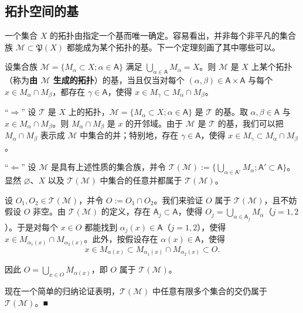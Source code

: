 \subsection*{拓扑空间的基}

一个集合 $ X $ 的拓扑由指定一个基而唯一确定。容易看出，并非每个非平凡的集合族 $ \mathcal{M} \subset \mathfrak{P}(X) $ 都能成为某个拓扑的基。下一个定理刻画了其中哪些可以。

\begin{theorem}

设集合族 $ \mathcal{M} = \{ M_\alpha \subset X ; \alpha \in \mathsf{A} \} $ 满足 $ \bigcup_{\alpha \in \mathsf{A}} M_\alpha = X $。则 $ \mathcal{M} $ 是 $ X $ 上某个拓扑（称为\textbf{由 $ \mathcal{M} $ 生成的拓扑}）的基，当且仅当对每个 $ (\alpha, \beta) \in \mathsf{A} \times \mathsf{A} $ 与每个 $ x \in M_\alpha \cap M_\beta $，都存在 $ \gamma \in \mathsf{A} $，使得 $ x \in M_\gamma \subset M_\alpha \cap M_\beta $。

\proofhead
“$ \Rightarrow $” 设 $ \mathcal{T} $ 是 $ X $ 上的拓扑，$ \mathcal{M} = \{ M_\alpha \subset X ; \alpha \in \mathsf{A} \} $ 是 $ \mathcal{T} $ 的基。取 $ \alpha, \beta \in \mathsf{A} $ 与 $ x \in M_\alpha \cap M_\beta $。则 $ M_\alpha \cap M_\beta $ 是 $ x $ 的开邻域。由于 $ \mathcal{M} $ 是 $ \mathcal{T} $ 的基，我们可以把 $ M_\alpha \cap M_\beta $ 表示成 $ \mathcal{M} $ 中集合的并；特别地，存在 $ \gamma \in \mathsf{A} $，使得 $ x \in M_\gamma \subset M_\alpha \cap M_\beta $。

“$ \Leftarrow $” 设 $ \mathcal{M} $ 是具有上述性质的集合族，并令 $ \mathcal{T}(\mathcal{M}) := \{ \bigcup_{\alpha \in \mathsf{A}'} M_\alpha ; \mathsf{A}' \subset \mathsf{A} \} $。显然 $ \varnothing $、$ X $ 以及 $ \mathcal{T}(\mathcal{M}) $ 中集合的任意并都属于 $ \mathcal{T}(\mathcal{M}) $。

设 $ O_1, O_2 \in \mathcal{T}(\mathcal{M}) $，并令 $ O := O_1 \cap O_2 $。我们来验证 $ O $ 属于 $ \mathcal{T}(\mathcal{M}) $，且不妨假设 $ O $ 非空。由 $ \mathcal{T}(\mathcal{M}) $ 的定义，存在 $ \mathsf{A}_j \subset \mathsf{A} $，使得 $ O_j = \bigcup_{\alpha \in \mathsf{A}_j} M_\alpha $（$ j = 1, 2 $）。于是对每个 $ x \in O $ 都能找到 $ \alpha_j(x) \in \mathsf{A} $（$ j = 1, 2 $），使得 $ x \in M_{\alpha_1(x)} \cap M_{\alpha_2(x)} $。此外，按假设存在 $ \alpha(x) \in \mathsf{A} $，使得
\[
x \in M_{\alpha(x)} \subset M_{\alpha_1(x)} \cap M_{\alpha_2(x)} \subset O .
\]

因此 $ O = \bigcup_{x \in O} M_{\alpha(x)} $，即 $ O $ 属于 $ \mathcal{T}(\mathcal{M}) $。

现在一个简单的归纳论证表明，$ \mathcal{T}(\mathcal{M}) $ 中任意有限多个集合的交仍属于 $ \mathcal{T}(\mathcal{M}) $。\nobreak\hspace{0.35em}■

\end{theorem}

